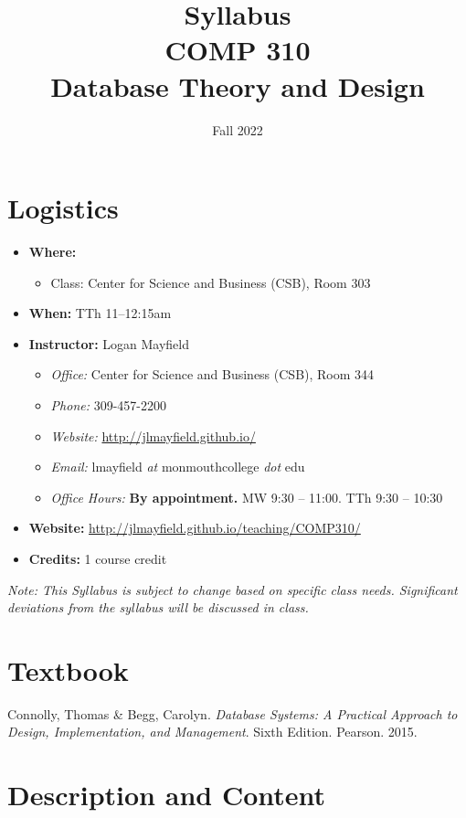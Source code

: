 \documentclass[10pt]{article}
\title{Syllabus \\ COMP 310 \\ Database Theory and Design}
\author{  }
\date{Fall 2022}
\begin{document}
\maketitle

\section{Logistics}
\begin{itemize}
\item \textbf{Where: }
\begin{itemize}
\item Class: Center for Science and Business (CSB), Room 303
\end{itemize}
\item \textbf{When: } TTh 11--12:15am
\item \textbf{Instructor: } Logan Mayfield
\begin{itemize}
\item \textit{Office: } Center for Science and Business (CSB), Room 344
\item \textit{Phone: } 309-457-2200 %
\item \textit{Website: } \url{http://jlmayfield.github.io/}
\item \textit{Email: } lmayfield \textit{at} monmouthcollege \textit{dot} edu
\item \textit{Office Hours: }  \textbf{By appointment.} MW 9:30 -- 11:00. TTh 9:30 -- 10:30
\end{itemize}
\item \textbf{Website: } \url{http://jlmayfield.github.io/teaching/COMP310/}
\item \textbf{Credits: } 1 course credit
\end{itemize}
\emph{Note: This Syllabus is subject to change based on specific class needs. Significant deviations from the syllabus will be discussed in class.}

\section{Textbook}

\noindent
Connolly, Thomas \& Begg, Carolyn. \textit{Database Systems: A Practical Approach to Design, Implementation, and Management}. Sixth Edition. Pearson. 2015. %

\section{Description and Content}
\end{document}

